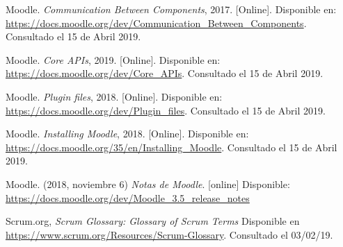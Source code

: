 \begin{thebibliography}{9}
        Moodle. {\it Communication Between Components}, 2017. [Online]. Disponible en:
        \url{https://docs.moodle.org/dev/Communication_Between_Components}. Consultado el 15 de Abril 2019.
    
        Moodle. {\it Core APIs}, 2019. [Online]. Disponible en:
        \url{https://docs.moodle.org/dev/Core_APIs}. Consultado el 15 de Abril 2019.
    
        Moodle. {\it Plugin files}, 2018. [Online]. Disponible en:
        \url{https://docs.moodle.org/dev/Plugin_files}. Consultado el 15 de Abril 2019.

        Moodle. {\it Installing Moodle}, 2018. [Online]. Disponible en:
        \url{https://docs.moodle.org/35/en/Installing_Moodle}. Consultado el 15 de Abril 2019.

        Moodle. (2018, noviembre 6) \textit{Notas de Moodle}. [online] Disponible:
        \url{https://docs.moodle.org/dev/Moodle_3.5_release_notes}



        Scrum.org,
        {\it Scrum Glossary: Glossary of Scrum Terms}
        Disponible en \url{https://www.scrum.org/Resources/Scrum-Glossary}. Consultado el 03/02/19.



\end{thebibliography}
